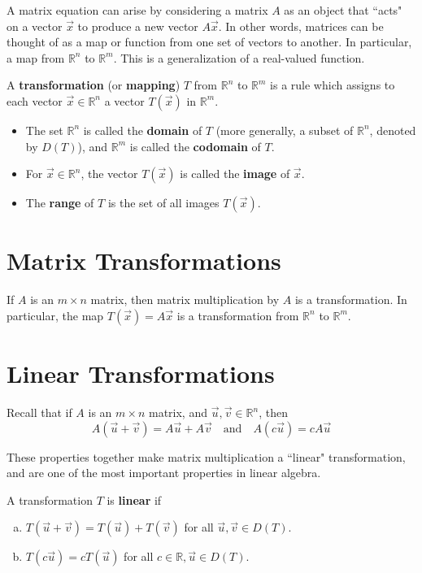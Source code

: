 \documentclass[letterpaper,12pt]{article}
\begin{document}
A matrix equation can arise by considering a matrix $A$ as an object that ``acts" on a vector $\vec{x}$ to produce a new vector $A\vec{x}$. In other words, matrices can be thought of as a map or function from one set of vectors to another. In particular, a map from $\mathbb{R}^n$ to $\mathbb{R}^m$. This is a generalization of a real-valued function.

\begin{definition}
A \textbf{transformation} (or \textbf{mapping}) $T$ from $\mathbb{R}^n$ to $\mathbb{R}^m$ is a rule which assigns to each vector $\vec{x} \in \mathbb{R}^n$ a vector $T(\vec{x})$ in $\mathbb{R}^m$.
\begin{itemize}
    \item The set $\mathbb{R}^n$ is called the \textbf{domain} of $T$ (more generally, a subset of $\mathbb{R}^n$, denoted by $D(T)$), and $\mathbb{R}^m$ is called the \textbf{codomain} of $T$.
    \item For $\vec{x} \in \mathbb{R}^n$, the vector $T(\vec{x})$ is called the \textbf{image} of $\vec{x}$.
    \item The \textbf{range} of $T$ is the set of all images $T(\vec{x})$.
\end{itemize}
\end{definition}

\section*{Matrix Transformations}
If $A$ is an $m \times n$ matrix, then matrix multiplication by $A$ is a transformation. In particular, the map $T(\vec{x}) = A\vec{x}$ is a transformation from $\mathbb{R}^n$ to $\mathbb{R}^m$.

\section*{Linear Transformations}
Recall that if $A$ is an $m \times n$ matrix, and $\vec{u}, \vec{v} \in \mathbb{R}^n$, then
\begin{equation*}
    A(\vec{u} + \vec{v}) = A\vec{u} + A\vec{v} \quad \text{and} \quad A(c\vec{u}) = cA\vec{u}
\end{equation*}

These properties together make matrix multiplication a ``linear" transformation, and are one of the most important properties in linear algebra.

\begin{definition}
A transformation $T$ is \textbf{linear} if
\begin{enumerate}[(a)]
    \item $T(\vec{u} + \vec{v}) = T(\vec{u}) + T(\vec{v})$ for all $\vec{u}, \vec{v} \in D(T)$.
    \item $T(c\vec{u}) = cT(\vec{u})$ for all $c \in \mathbb{R}, \vec{u} \in D(T)$.
\end{enumerate}
\end{definition}
\end{document}
